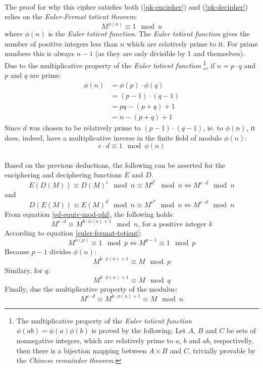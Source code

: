 \documentclass[a4paper, 10pt]{article}
\begin{document}
\paragraph*{}
The proof for why this cipher satisfies both (\ref{pk-encipher}) and (\ref{pk-decipher}) relies on the 
\textit{Euler-Fermat totient theorem}:
\begin{equation} \label{euler-fermat-totient}
M^{\phi (n)} \equiv 1 \mod n
\end{equation}
where $\phi(n)$ is the \textit{Euler totient function}. The \textit{Euler totient function} gives the number of 
positive integers less than $n$ which are relatively prime to it. For prime numbers this is always $n-1$ (as they are 
only divisible by 1 and themselves). Due to the multiplicative property of the \textit{Euler totient function}
\footnote{The multiplicative property of the \textit{Euler totient function} $\phi(ab) = \phi(a)\phi(b)$ is proved by 
the following: Let $A$, $B$ and $C$ be sets of nonnegative integers, which are relatively prime to $a$, $b$ and $ab$, 
respectivelly, then there is a bijection mapping between $A \times B$ and $C$, trivially provable by the 
\textit{Chinese remainder theorem}.}, if $n = p \cdot q$ and $p$ and $q$ are prime:
\begin{equation}
\begin{split}
\phi (n) & = \phi (p) \cdot \phi (q) \\
		 & = (p - 1) \cdot (q - 1) \\
		 & = pq - (p + q) + 1 \\
		 & = n - (p + q) + 1
\end{split}
\end{equation}
Since $d$ was chosen to be relatively prime to $(p - 1) \cdot (q - 1)$, ie. to $\phi (n)$, it does, indeed, have a 
multiplicative inverse in the finite field of modulo $\phi (n)$:
\begin{equation} \label{ed-equiv-mod-phi}
e \cdot d \equiv 1 \mod \phi(n)
\end{equation}

\paragraph*{}
Based on the previous deductions, the following can be asserted for the enciphering and deciphering functions $E$ and 
$D$.
$$E(D(M)) \equiv D(M)^{e} \mod n \equiv M^{d^{e}} \mod n \Longleftrightarrow M^{e \cdot d} \mod n$$
and
$$D(E(M)) \equiv E(M)^{d} \mod n \equiv M^{e^{d}} \mod n \Longleftrightarrow M^{e \cdot d} \mod n$$
From equation \ref{ed-equiv-mod-phi}, the following holds:
$$M^{e \cdot d} \equiv M^{k \cdot \phi (n) + 1} \mod n\text{, for a positive integer $k$}$$
According to equation \ref{euler-fermat-totient}:
$$M^{\phi (p)} \equiv 1 \mod p \Longleftrightarrow M^{p - 1} \equiv 1 \mod p$$
Because $p - 1$ divides $\phi (n)$:
$$M^{k \cdot \phi (n) + 1} \equiv M \mod p$$
Similary, for $q$:
$$M^{k \cdot \phi (n) + 1} \equiv M \mod q$$
Finally, due the multiplicative property of the modulus:
$$M^{e \cdot d} \equiv M^{k \cdot \phi (n) + 1} \equiv M \mod n$$
\end{document}
